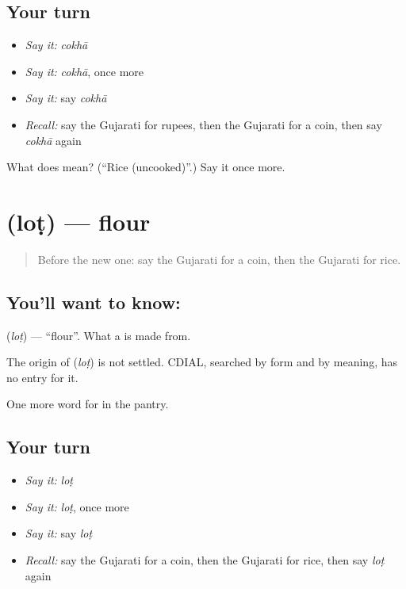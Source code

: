 \subsection*{Your turn}
\begin{itemize}
\raggedright
  \item \emph{Say it:} \emph{cokhā}
  \item \emph{Say it:} \emph{cokhā}, once more
  \item \emph{Say it:} say \emph{cokhā}
  \item \emph{Recall:} say the Gujarati for rupees, then the Gujarati for a coin, then say \emph{cokhā} again
\end{itemize}

\begin{tcolorbox}[breakable,colback=teal!4,colframe=teal!35!black,title={Before you move on}]
What does  mean? (\textquotedblleft{}Rice (uncooked)\textquotedblright{}.) Say it once more.
\end{tcolorbox}
\section[\texorpdfstring{\gu{લોટ} (loṭ)}{લોટ (loṭ)}]{ (loṭ) — flour}

\label{lesson:GU-C58-flour}



\begin{quote}
Before the new one: say the Gujarati for a coin, then the Gujarati for rice.
\end{quote}

\subsection*{You'll want to know: }
\textbf{} (\emph{loṭ}) — \textquotedblleft{}flour\textquotedblright{}. What a \textbf{} is made from.

\begin{cousinweb}
The origin of \textbf{} (\emph{loṭ}) is not settled. CDIAL, searched by form and by meaning, has no entry for it.
\end{cousinweb}

\begin{grammarlens}[title={What you've built}]
One more word for in the pantry.
\end{grammarlens}

\subsection*{Your turn}
\begin{itemize}
\raggedright
  \item \emph{Say it:} \emph{loṭ}
  \item \emph{Say it:} \emph{loṭ}, once more
  \item \emph{Say it:} say \emph{loṭ}
  \item \emph{Recall:} say the Gujarati for a coin, then the Gujarati for rice, then say \emph{loṭ} again
\end{itemize}

